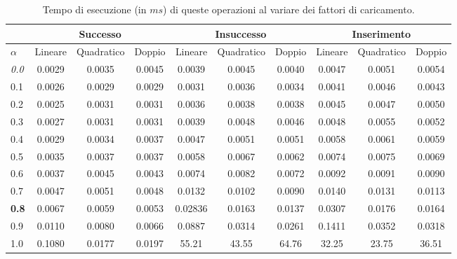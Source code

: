 \documentclass{article}
\begin{document}
\begin{center}
\begin{table}[H]
\begin{tabular}{c|c|c|c||c|c|c||c|c|c|}
\cline{2-10}
& \multicolumn{3}{c||}{Successo} & \multicolumn{3}{c||}{Insuccesso} & \multicolumn{3}{c|}{Inserimento} \\
\hline
\multicolumn{1}{|l|}{$\alpha$} & Lineare & Quadratico & Doppio & Lineare & Quadratico & Doppio  & Lineare & Quadratico & Doppio \\
\hline
\multicolumn{1}{|l|}{\emph{0.0}} & 0.0029 & 0.0035 & 0.0045 & 0.0039 & 0.0045 & 0.0040 & 0.0047 & 0.0051 & 0.0054 \\
\hline
\multicolumn{1}{|l|}{0.1} & 0.0026 & 0.0029 & 0.0029 & 0.0031 & 0.0036 & 0.0034 & 0.0041 & 0.0046 & 0.0043 \\
\hline
\multicolumn{1}{|l|}{0.2} & 0.0025 & 0.0031 & 0.0031 & 0.0036 & 0.0038 & 0.0038 & 0.0045 & 0.0047 & 0.0050 \\
\hline
\multicolumn{1}{|l|}{0.3} & 0.0027 & 0.0031 & 0.0031 & 0.0039 & 0.0048 & 0.0046 & 0.0048 & 0.0055 & 0.0052 \\
\hline
\multicolumn{1}{|l|}{0.4} & 0.0029 & 0.0034 & 0.0037 & 0.0047 & 0.0051 & 0.0051 & 0.0058 & 0.0061 & 0.0059 \\
\hline
\multicolumn{1}{|l|}{0.5} & 0.0035 & 0.0037 & 0.0037 & 0.0058 & 0.0067 & 0.0062 & 0.0074 & 0.0075 & 0.0069 \\
\hline
\multicolumn{1}{|l|}{0.6} & 0.0037 & 0.0045 & 0.0043 & 0.0074 & 0.0082 & 0.0072 & 0.0092 & 0.0091 & 0.0090 \\
\hline
\multicolumn{1}{|l|}{0.7} & 0.0047 & 0.0051 & 0.0048 & 0.0132 & 0.0102 & 0.0090 & 0.0140 & 0.0131 & 0.0113 \\
\hline
\multicolumn{1}{|l|}{\textbf{0.8}} & 0.0067 & 0.0059 & 0.0053 & 0.02836 & 0.0163 & 0.0137 & 0.0307 & 0.0176 & 0.0164 \\
\hline
\multicolumn{1}{|l|}{0.9} & 0.0110 & 0.0080 & 0.0066 & 0.0887 & 0.0314 & 0.0261 & 0.1411 & 0.0352 & 0.0318 \\
\hline
\multicolumn{1}{|l|}{1.0} & 0.1080 & 0.0177 & 0.0197 & 55.21 & 43.55 & 64.76 & 32.25 & 23.75 & 36.51 \\
\hline
\end{tabular}
\caption{Tempo di esecuzione (in $ms$) di queste operazioni al variare dei fattori di caricamento.}
\label{tab:Confronto_tempi}
\end{table}
\end{center}
\end{document}
